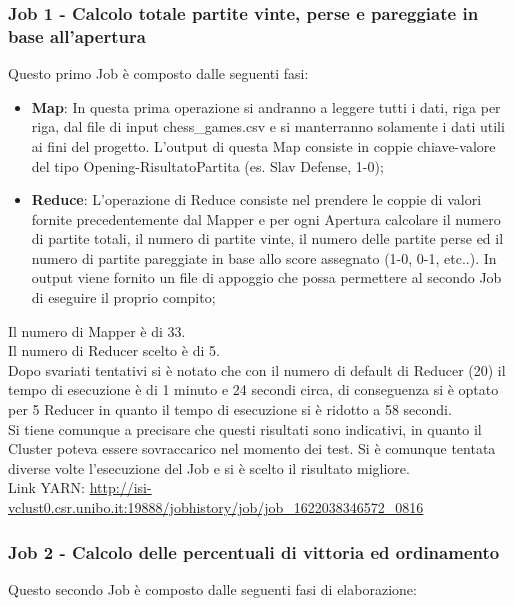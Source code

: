 \documentclass[10pt]{article}
\begin{document}
\subsubsection{Job 1 - Calcolo totale partite vinte, perse e pareggiate in base all'apertura}

Questo primo Job \`e composto dalle seguenti fasi:

\begin{itemize}
    \item \textbf{Map}: In questa prima operazione si andranno a leggere tutti i dati, riga per riga, dal file di input chess\_games.csv e si manterranno solamente i dati utili ai fini del progetto. L'output di questa Map consiste in coppie chiave-valore del tipo Opening-RisultatoPartita (es. Slav Defense, 1-0);
    \item \textbf{Reduce}: L'operazione di Reduce consiste nel prendere le coppie di valori fornite precedentemente dal Mapper e per ogni Apertura calcolare il numero di partite totali, il numero di partite vinte, il numero delle partite perse ed il numero di partite pareggiate in base allo score assegnato (1-0, 0-1, etc..). In output viene fornito un file di appoggio che possa permettere al secondo Job di eseguire il proprio compito;
\end{itemize}
Il numero di Mapper \`e di 33.\\
Il numero di Reducer scelto \`e di 5.\\
Dopo svariati tentativi si \`e notato che con il numero di default di Reducer (20) il tempo di esecuzione \`e di 1 minuto e 24 secondi circa, di conseguenza si \`e optato per 5 Reducer in quanto il tempo di esecuzione si \`e ridotto a 58 secondi.\\
Si tiene comunque a precisare che questi risultati sono indicativi, in quanto il Cluster poteva essere sovraccarico nel momento dei test. Si \`e comunque tentata diverse volte l'esecuzione del Job e si \`e scelto il risultato migliore.\\
Link YARN: \url{http://isi-vclust0.csr.unibo.it:19888/jobhistory/job/job_1622038346572_0816}

\subsubsection{Job 2 - Calcolo delle percentuali di vittoria ed ordinamento}

Questo secondo Job \`e composto dalle seguenti fasi di elaborazione:
\end{document}
